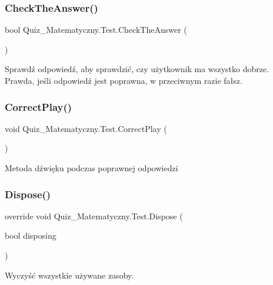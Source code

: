 \subsubsection{\texorpdfstring{CheckTheAnswer()}{CheckTheAnswer()}}
{\footnotesize\ttfamily bool Quiz\+\_\+\+Matematyczny.\+Test.\+Check\+The\+Answer (\begin{DoxyParamCaption}{ }\end{DoxyParamCaption})\hspace{0.3cm}{\ttfamily [private]}}

Sprawdź odpowiedź, aby sprawdzić, czy użytkownik ma wszystko dobrze. Prawda, jeśli odpowiedź jest poprawna, w przeciwnym razie fałsz. \mbox{\label{class_quiz___matematyczny_1_1_test_a2a3a7d1009cef2703bee2090b5ec89b1}} 
\subsubsection{\texorpdfstring{CorrectPlay()}{CorrectPlay()}}
{\footnotesize\ttfamily void Quiz\+\_\+\+Matematyczny.\+Test.\+Correct\+Play (\begin{DoxyParamCaption}{ }\end{DoxyParamCaption})\hspace{0.3cm}{\ttfamily [private]}}

Metoda dźwięku podczas poprawnej odpowiedzi \mbox{\label{class_quiz___matematyczny_1_1_test_a85b3e2c740c7989fdaa2d8c3db872ba1}} 
\subsubsection{\texorpdfstring{Dispose()}{Dispose()}}
{\footnotesize\ttfamily override void Quiz\+\_\+\+Matematyczny.\+Test.\+Dispose (\begin{DoxyParamCaption}\item[{bool}]{disposing }\end{DoxyParamCaption})\hspace{0.3cm}{\ttfamily [protected]}}



Wyczyść wszystkie używane zasoby. 


